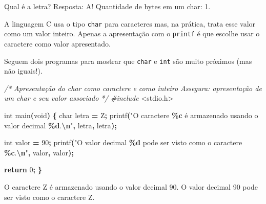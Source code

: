 \documentclass[
  11pt,
  a4paper,
]{scrbook}
\newenvironment{Shaded}{\begin{snugshade}}{\end{snugshade}}
\newcommand{\CharTok}[1]{\textcolor[rgb]{0.31,0.60,0.02}{#1}}
\newcommand{\CommentTok}[1]{\textcolor[rgb]{0.56,0.35,0.01}{\textit{#1}}}
\newcommand{\ControlFlowTok}[1]{\textcolor[rgb]{0.13,0.29,0.53}{\textbf{#1}}}
\newcommand{\DataTypeTok}[1]{\textcolor[rgb]{0.13,0.29,0.53}{#1}}
\newcommand{\DecValTok}[1]{\textcolor[rgb]{0.00,0.00,0.81}{#1}}
\newcommand{\ImportTok}[1]{#1}
\newcommand{\NormalTok}[1]{#1}
\newcommand{\OperatorTok}[1]{\textcolor[rgb]{0.81,0.36,0.00}{\textbf{#1}}}
\newcommand{\PreprocessorTok}[1]{\textcolor[rgb]{0.56,0.35,0.01}{\textit{#1}}}
\newcommand{\SpecialCharTok}[1]{\textcolor[rgb]{0.81,0.36,0.00}{\textbf{#1}}}
\newcommand{\StringTok}[1]{\textcolor[rgb]{0.31,0.60,0.02}{#1}}
\begin{document}
\begin{Shaded}
\begin{Highlighting}[]
\NormalTok{Qual é a letra? Resposta: A!}
\NormalTok{Quantidade de bytes em um char: 1.}
\end{Highlighting}
\end{Shaded}

A linguagem C usa o tipo \texttt{char} para caracteres mas, na prática,
trata esse valor como um valor inteiro. Apenas a apresentação com o
\texttt{printf} é que escolhe usar o caractere como valor apresentado.

Seguem dois programas para mostrar que \texttt{char} e \texttt{int} são
muito próximos (mas não iguais!).

\begin{Shaded}
\begin{Highlighting}[]
\CommentTok{/*}
\CommentTok{Apresentação do char como caractere e como inteiro}
\CommentTok{Assegura: apresentação de um char e seu valor associado}
\CommentTok{*/}
\PreprocessorTok{\#include }\ImportTok{\textless{}stdio.h\textgreater{}}

\DataTypeTok{int}\NormalTok{ main}\OperatorTok{(}\DataTypeTok{void}\OperatorTok{)} \OperatorTok{\{}
    \DataTypeTok{char}\NormalTok{ letra }\OperatorTok{=} \CharTok{\textquotesingle{}Z\textquotesingle{}}\OperatorTok{;}
\NormalTok{    printf}\OperatorTok{(}\StringTok{"O caractere }\SpecialCharTok{\%c}\StringTok{ é armazenado usando o valor decimal }\SpecialCharTok{\%d}\StringTok{.}\SpecialCharTok{\textbackslash{}n}\StringTok{"}\OperatorTok{,}
\NormalTok{           letra}\OperatorTok{,}\NormalTok{ letra}\OperatorTok{);}

    \DataTypeTok{int}\NormalTok{ valor }\OperatorTok{=} \DecValTok{90}\OperatorTok{;}
\NormalTok{    printf}\OperatorTok{(}\StringTok{"O valor decimal }\SpecialCharTok{\%d}\StringTok{ pode ser visto como o caractere }\SpecialCharTok{\%c}\StringTok{.}\SpecialCharTok{\textbackslash{}n}\StringTok{"}\OperatorTok{,}
\NormalTok{            valor}\OperatorTok{,}\NormalTok{ valor}\OperatorTok{);}

    \ControlFlowTok{return} \DecValTok{0}\OperatorTok{;}
\OperatorTok{\}}
\end{Highlighting}
\end{Shaded}

\begin{Shaded}
\begin{Highlighting}[]
\NormalTok{O caractere Z é armazenado usando o valor decimal 90.}
\NormalTok{O valor decimal 90 pode ser visto como o caractere Z.}
\end{Highlighting}
\end{Shaded}
\end{document}
